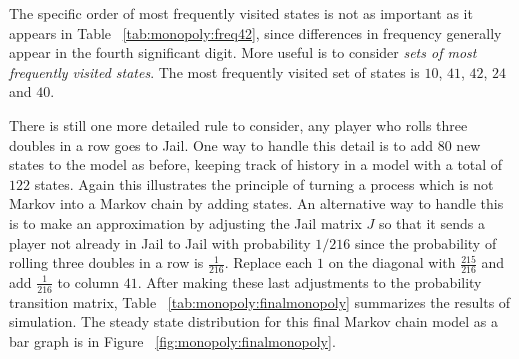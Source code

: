 \documentclass[12pt]{article}
\begin{document}
The specific order of most frequently visited states is not as important
as it appears in Table~%
\ref{tab:monopoly:freq42}, since differences in frequency generally
appear in the fourth significant digit.  More useful is to consider
\emph{sets of most frequently visited states}.  The most frequently
visited set of states is \( 10 \), \( 41 \), \( 42 \), \( 24 \) and \(
40 \).

There is still one more detailed rule to consider, any player who rolls
three doubles in a row goes to Jail.  One way to handle this detail is
to add \( 80 \) new states to the model as before, keeping track of
history in a model with a total of \( 122 \) states.  Again this
illustrates the principle of turning a process which is not Markov into
a Markov chain by adding states.  An alternative way to handle this is
to make an approximation by adjusting the Jail matrix \( J \) so that it
sends a player not already in Jail to Jail with probability \( 1/216 \)
since the probability of rolling three doubles in a row is \( \frac{1}{216}
\).  Replace each \( 1 \) on the diagonal with \( \frac{215}{216} \) and
add \( \frac{1}{216} \) to column \( 41 \). After making these last
adjustments to the probability transition matrix, Table~%
\ref{tab:monopoly:finalmonopoly} summarizes the results of simulation.
The steady state distribution for this final Markov chain model as a bar
graph is in Figure~%
\ref{fig:monopoly:finalmonopoly}.
\end{document}
